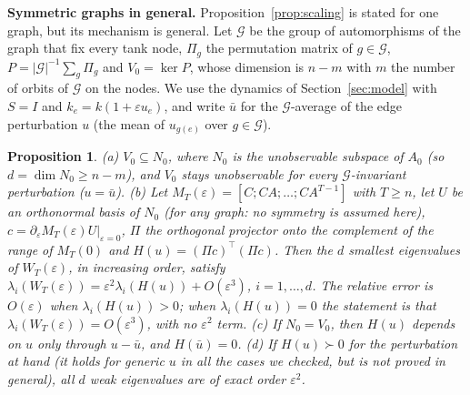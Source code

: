 \documentclass[conference]{IEEEtran}
\newtheorem{proposition}{Proposition}
\begin{document}
\begin{table}[t]
\centering
\caption{Observability of other topologies.}
\label{tab:topo}
\small
\setlength{\tabcolsep}{3pt}
\end{table}

\textbf{Symmetric graphs in general.} Proposition~\ref{prop:scaling} is stated for one graph, but its mechanism is general. Let $\mathcal G$ be the group of automorphisms of the graph that fix every tank node, $\Pi_g$ the permutation matrix of $g\in\mathcal G$, $P=|\mathcal G|^{-1}\sum_{g}\Pi_g$ and $V_0=\ker P$, whose dimension is $n-m$ with $m$ the number of orbits of $\mathcal G$ on the nodes. We use the dynamics of Section~\ref{sec:model} with $S=I$ and $k_e=k(1+\varepsilon u_e)$, and write $\bar u$ for the $\mathcal G$-average of the edge perturbation $u$ (the mean of $u_{g(e)}$ over $g\in\mathcal G$).

\begin{proposition}\label{prop:sym}
(a) $V_0\subseteq N_0$, where $N_0$ is the unobservable subspace of $A_0$ (so $d=\dim N_0\ge n-m$), and $V_0$ stays unobservable for every $\mathcal G$-invariant perturbation ($u=\bar u$). (b) Let $M_T(\varepsilon)=[C;CA;\dots;CA^{T-1}]$ with $T\ge n$, let $U$ be an orthonormal basis of $N_0$ (for any graph: no symmetry is assumed here), $c=\partial_\varepsilon M_T(\varepsilon)U|_{\varepsilon=0}$, $\Pi$ the orthogonal projector onto the complement of the range of $M_T(0)$ and $H(u)=(\Pi c)^\top(\Pi c)$. Then the $d$ smallest eigenvalues of $W_T(\varepsilon)$, in increasing order, satisfy $\lambda_i(W_T(\varepsilon))=\varepsilon^2\lambda_i(H(u))+O(\varepsilon^3)$, $i=1,\dots,d$. The relative error is $O(\varepsilon)$ when $\lambda_i(H(u))>0$; when $\lambda_i(H(u))=0$ the statement is that $\lambda_i(W_T(\varepsilon))=O(\varepsilon^3)$, with no $\varepsilon^2$ term. (c) If $N_0=V_0$, then $H(u)$ depends on $u$ only through $u-\bar u$, and $H(\bar u)=0$. (d) If $H(u)\succ0$ for the perturbation at hand (it holds for generic $u$ in all the cases we checked, but is not proved in general), all $d$ weak eigenvalues are of exact order $\varepsilon^2$.
\end{proposition}
\end{document}

